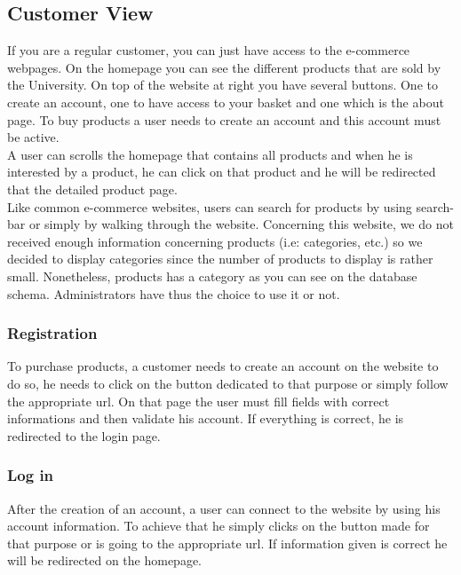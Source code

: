 \documentclass{article}
\begin{document}
\subsection{Customer View}
If you are a regular customer, you can just have access to the e-commerce webpages. On the homepage you can see the different products that are sold by the University. On top of the website at right you have several buttons. One to create an account, one to have access to your basket and one which is the about page. To buy products a user needs to create an account and this account must be active.\\

A user can scrolls the homepage that contains all products and when he is interested by a product, he can click on that product and he will be redirected that the detailed product page.\\

Like common e-commerce websites, users can search for products by using search-bar or simply by walking through the website. Concerning this website, we do not received enough information concerning products (i.e: categories, etc.) so we decided to display categories since the number of products to display is rather small. Nonetheless, products has a category as you can see on the database schema. Administrators have thus the choice to use it or not.

\subsubsection{Registration}
To purchase products, a customer needs to create an account on the website to do so, he needs to click on the button dedicated to that purpose or simply follow the appropriate url. On that page the user must fill fields with correct informations and then validate his account. If everything is correct, he is redirected to the login page.
 
\subsubsection{Log in}
After the creation of an account, a user can connect to the website by using his account information. To achieve that he simply clicks on the button made for that purpose or is going to the appropriate url. If information given is correct he will be redirected on the homepage.
\end{document}

